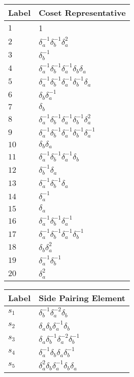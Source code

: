 \documentclass{article}
\begin{document}
\begin{center}
\begin{tabular}{ll}
\toprule
Label & Coset Representative\\
\midrule
$1$ & 1 \\
$2$ & $\delta_a^{-1}\delta_b^{-1}\delta_a^{2}$ \\
$3$ & $\delta_b^{-1}$ \\
$4$ & $\delta_a^{-1}\delta_b^{-1}\delta_a^{-1}\delta_b^{}\delta_a^{}$ \\
$5$ & $\delta_a^{-1}\delta_b^{-1}\delta_a^{-1}\delta_b^{-1}\delta_a^{}$ \\
$6$ & $\delta_b^{}\delta_a^{-1}$ \\
$7$ & $\delta_b^{}$ \\
$8$ & $\delta_a^{-1}\delta_b^{-1}\delta_a^{-1}\delta_b^{-1}\delta_a^{2}$ \\
$9$ & $\delta_a^{-1}\delta_b^{-1}\delta_a^{-1}\delta_b^{-1}\delta_a^{-1}$ \\
$10$ & $\delta_b^{}\delta_a^{}$ \\
$11$ & $\delta_a^{-1}\delta_b^{-1}\delta_a^{-1}\delta_b^{}$ \\
$12$ & $\delta_b^{-1}\delta_a^{}$ \\
$13$ & $\delta_a^{-1}\delta_b^{-1}\delta_a^{}$ \\
$14$ & $\delta_a^{-1}$ \\
$15$ & $\delta_a^{}$ \\
$16$ & $\delta_a^{-1}\delta_b^{-1}\delta_a^{-1}$ \\
$17$ & $\delta_a^{-1}\delta_b^{-1}\delta_a^{-1}\delta_b^{-1}$ \\
$18$ & $\delta_b^{}\delta_a^{2}$ \\
$19$ & $\delta_a^{-1}\delta_b^{-1}$ \\
$20$ & $\delta_a^{2}$ \\
\bottomrule
\end{tabular}
\hfill
\begin{tabular}{ll}
\toprule
Label & Side Pairing Element\\
\midrule
$s_{1}$ & $\delta_b^{-1}\delta_a^{-2}\delta_b^{}$ \\
$s_{2}$ & $\delta_a^{}\delta_b^{}\delta_a^{-1}\delta_b^{}$ \\
$s_{3}$ & $\delta_a^{}\delta_b^{-1}\delta_a^{-2}\delta_b^{-1}$ \\
$s_{4}$ & $\delta_a^{-1}\delta_b^{}\delta_a^{}\delta_b^{-1}$ \\
$s_{5}$ & $\delta_a^{2}\delta_b^{}\delta_a^{-1}\delta_b^{}\delta_a^{}$ \\

\end{tabular}
\end{center}
\end{document}
